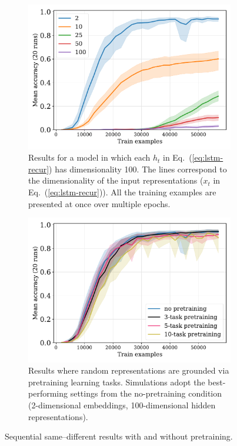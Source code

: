 \documentclass{article}
\newcommand{\eg}[1]{(\ref{#1})}
\begin{document}
\begin{figure}[tp]
\centering
\begin{subfigure}[t]{0.48\textwidth}
 \centering
 \includegraphics[width=1\linewidth]{./fuzzy-lm-vocab20-train_size-embed_dim-hidden_dim=100.pdf}
 \caption{Results for a model in which each $h_{t}$ in Eq.~\eg{eq:lstm-recur} has dimensionality 100. The lines correspond to the dimensionality of the input representations ($x_t$ in Eq.~\eg{eq:lstm-recur}). All the training examples are presented at once over multiple epochs.}
 \label{fig:fuzzy-lm-results}
\end{subfigure}
\hfill
\begin{subfigure}[t]{0.48\textwidth}
 \centering
 \includegraphics[width=1\linewidth]{./fuzzy-lm-pretrain-compare-train_size-pretrained-embed_dim=None.pdf}
 \caption{Results where random representations are grounded via pretraining learning tasks. Simulations adopt the best-performing settings from the no-pretraining condition (2-dimensional embeddings, 100-dimensional hidden representations).}
 \label{fig:fuzzy-lm-pretrain-results}
\end{subfigure}
\caption{Sequential same--different results with and without pretraining.}
\end{figure}
\end{document}
